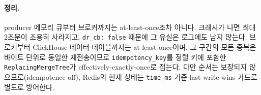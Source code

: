 \paragraph{정리.} producer 메모리 큐부터 브로커까지는 at-least-once조차 아니다.
크래시가 나면 최대 2초분이 조용히 사라지고, \texttt{dr\_cb: false} 때문에 그 유실은
로그에도 남지 않는다. 브로커부터 ClickHouse 데이터 테이블까지는 at-least-once이며,
그 구간의 모든 중복은 바이트 단위로 동일한 재전송이므로 \texttt{idempotency\_key}를
정렬 키에 포함한 \texttt{ReplacingMergeTree}가 effectively-exactly-once로 접는다.
다만 순서는 보장되지 않으므로(idempotence off), Redis의 현재 상태는
\texttt{time\_ms} 기준 last-write-wins 가드로 별도로 방어한다.
